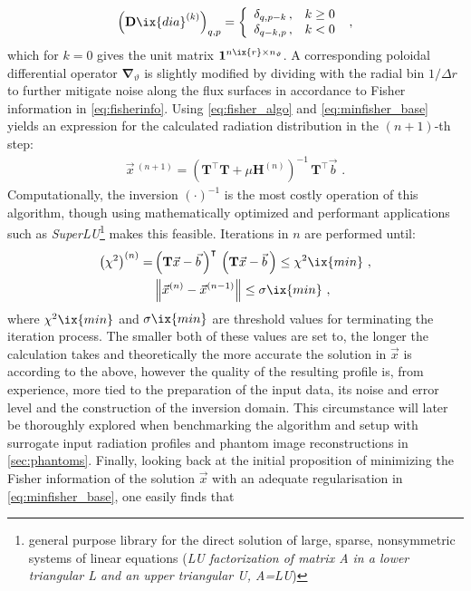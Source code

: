 %
        \begin{align}%
            \left(\mathbf{D}\ix{dia}^{\left(k\right)}\right)_{q,p}=\left\{%
            \begin{array}{ll}%
                \delta_{q,p-k}\,,&k\ge0\\%
                \delta_{q-k,p}\,,&k<0%
            \end{array}\right.\,\,,\nonumber%
        \end{align}%
%
        which for $k=0$ gives the unit matrix $\mathbf{1}^{n\ix{r}\times n_{\text{$\vartheta$}}}$. A corresponding poloidal differential operator $\pmb{\nabla}_{\vartheta}$ is slightly modified by dividing with the radial bin $1/\Delta r$ to further mitigate noise along the flux surfaces in accordance to Fisher information in \cref{eq:fisherinfo}. Using \cref{eq:fisher_algo} and \cref{eq:minfisher_base} yields an expression for the calculated radiation distribution in the $\left(n+1\right)$-th step:
%
        \begin{align}%
            \vec{x}\,^{\left(n+1\right)}=\left(\mathbf{T}^{\intercal}\mathbf{T}+\mu\mathbf{H}^{\left(n\right)}\right)^{-1}\,\mathbf{T}^{\intercal}\vec{b}\,\,.\label{eq:fisher_iteration}%
        \end{align}%
%
        Computationally, the inversion $\left(\cdot\right)^{-1}$ is the most costly operation of this algorithm, though using mathematically optimized and performant applications such as \textit{SuperLU}\footnote[1]{general purpose library for the direct solution of large, sparse, nonsymmetric systems of linear equations (\textit{LU factorization of matrix A in a lower triangular L and an upper triangular U, A=LU})}\cite{Li2005} makes this feasible. Iterations in $n$ are performed until:%
%
        \begin{align}
            \begin{split}%
                \left(\chi^{2}\right)^{\left(n\right)}=&\left(\mathbf{T}\vec{x}-\vec{b\,}\right)^{\intercal}\,\left(\mathbf{T}\vec{x}-\vec{b}\,\right)\le\chi^{2}\ix{min}\,\,,\\%
                &\left\|\vec{x}^{\left(n\right)}-\vec{x}^{\left(n-1\right)}\right\|\le\sigma\ix{min}\,\,,%
            \end{split}%
        \end{align}
%
        where $\chi^{2}\ix{min}$ and $\sigma\ix{min}$ are threshold values for terminating the iteration process. The smaller both of these values are set to, the longer the calculation takes and theoretically the more accurate the solution in $\vec{x}$ is according to the above, however the quality of the resulting profile is, from experience, more tied to the preparation of the input data, its noise and error level and the construction of the inversion domain. This circumstance will later be thoroughly explored when benchmarking the algorithm and setup with surrogate input radiation profiles and phantom image reconstructions in \cref{sec:phantoms}. Finally, looking back at the initial proposition of minimizing the Fisher information of the solution $\vec{x}$ with an adequate regularisation in \cref{eq:minfisher_base}, one easily finds that
